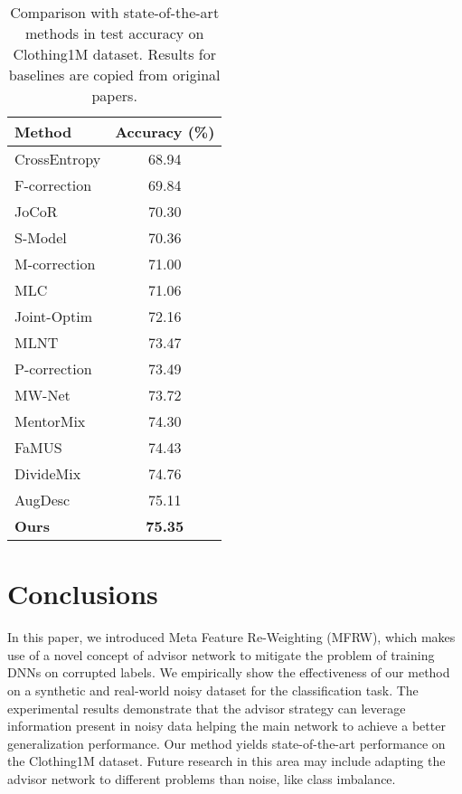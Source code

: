 \documentclass[runningheads]{llncs}
\begin{document}
	
	\begin{table}[!t]
		\centering
		\caption{\label{clothing} Comparison with state-of-the-art methods in test accuracy  on Clothing1M dataset. Results for baselines are copied from original papers.}
		\begin{tabular}{l|c}
			\hline
			Method       & Accuracy (\%) \\ \hline
			CrossEntropy \cite{shu2019meta}          & 68.94         \\
			F-correction \cite{patrini2017making} & 69.84         \\
			JoCoR \cite{wei2020combating}       & 70.30         \\
			S-Model \cite{goldberger2016training} & 70.36         \\
			M-correction \cite{arazo2019unsupervised} & 71.00         \\
			MLC \cite{wang2020training}         & 71.06         \\
			Joint-Optim \cite{tanaka2018joint}  & 72.16         \\
			MLNT \cite{li2019learning}        & 73.47         \\
			P-correction \cite{yi2019probabilistic} & 73.49         \\
			MW-Net \cite{shu2019meta}      & 73.72         \\
			MentorMix \cite{jiang2020beyond}   & 74.30         \\
			FaMUS \cite{xu2021faster} & 74.43 \\
			DivideMix \cite{li2019dividemix} & 74.76 \\
			AugDesc \cite{nishi2021augmentation} & 75.11 \\ \hline
			\textbf{Ours}         & \textbf{75.35}         \\ \hline
		\end{tabular}
	\end{table}
	
	\section{Conclusions}
	
	In this paper, we introduced Meta Feature Re-Weighting (MFRW), which makes use of a novel concept of advisor network to mitigate the problem of training DNNs on corrupted labels. We empirically show the effectiveness of our method on a synthetic and real-world noisy dataset for the classification task. The experimental results demonstrate that the advisor strategy can leverage information present in noisy data helping the main network to achieve a better generalization performance. Our method yields state-of-the-art performance on the Clothing1M dataset. Future research in this area may include adapting the advisor network to different problems than noise, like class imbalance.
	

	
\end{document}
